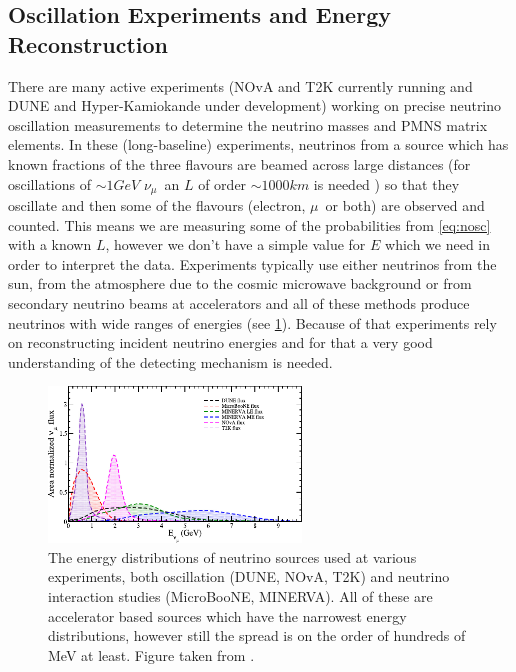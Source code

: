 \documentclass[a4paper,12pt]{article}
\newcommand{\Mu}{$\mu$}
\newcommand{\Nm}{$\nu_\mu$}
\begin{document}
\subsection{Oscillation Experiments and Energy Reconstruction}\label{sec:exanderec}
There are many active experiments (NOvA\cite{pattersonNOvAExperimentStatus2013} and T2K\cite{abeT2KExperiment2011} currently running and DUNE\cite{falconeDeepUndergroundNeutrino2022} and Hyper-Kamiokande\cite{yokoyamaHyperKamiokandeExperiment2017} under development) working on precise neutrino oscillation measurements to determine the neutrino masses and PMNS matrix elements.
In these (long-baseline) experiments, neutrinos from a source which has known fractions of the three flavours are beamed across large distances (for oscillations of $\sim 1\si{GeV}$ \Nm\ an $L$ of order $\sim 1000\si{km}$ is needed \cite{mezzettoThreeFlavorOscillationsAccelerator2020}) so that they oscillate and then some of the flavours (electron, \Mu\ or both) are observed and counted.
This means we are measuring some of the probabilities from \cref{eq:nosc} with a known $L$, however we don't have a simple value for $E$ which we need in order to interpret the data.
Experiments typically use either neutrinos from the sun, from the atmosphere due to the cosmic microwave background or from secondary neutrino beams at accelerators and all of these methods produce neutrinos with wide ranges of energies (see \cref{fig:neu_s_Es}).
Because of that experiments rely on reconstructing incident neutrino energies and for that a very good understanding of the detecting mechanism is needed.

\begin{figure}[H]
    \centering
    \includegraphics[width=0.6\textwidth]{figures/sourceEnergies.pdf}
    \caption{
        The energy distributions of neutrino sources used at various experiments, both oscillation (DUNE, NOvA, T2K) and neutrino interaction studies (MicroBooNE\cite{acciarriDesignConstructionMicroBooNE2017}, MINERVA\cite{mcfarlandMINERnADedicatedNeutrino2006}).
        All of these are accelerator based sources which have the narrowest energy distributions, however still the spread is on the order of hundreds of \si{MeV} at least.
        Figure taken from \cite{sajjadatharNeutrinosTheirInteractions2023}.
    }\label{fig:neu_s_Es}
\end{figure}
\end{document}
